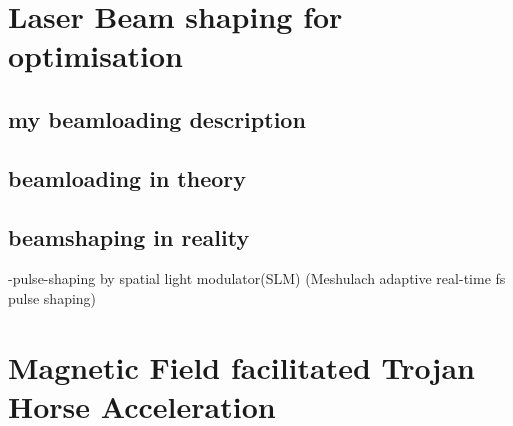 \section{Laser Beam shaping for optimisation}
\subsection{my beamloading description}
\subsection{beamloading in theory}

\subsection{beamshaping in reality}
-pulse-shaping by spatial light modulator(SLM) (Meshulach adaptive real-time fs pulse shaping)

\section{Magnetic Field facilitated Trojan Horse Acceleration}

